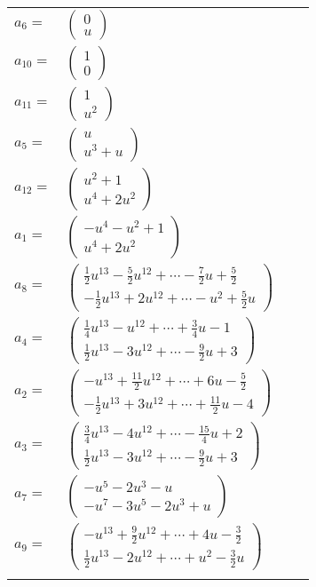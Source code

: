\documentclass[1p]{elsarticle_modified}
\theoremstyle{definition}
\begin{document}
\begin{tabular}{m{7pt} m{180pt} m{7pt} m{180pt} }
\flushright $a_{6}=$&$\begin{pmatrix}0\\u\end{pmatrix}$ \\
\flushright $a_{10}=$&$\begin{pmatrix}1\\0\end{pmatrix}$ \\
\flushright $a_{11}=$&$\begin{pmatrix}1\\u^2\end{pmatrix}$ \\
\flushright $a_{5}=$&$\begin{pmatrix}u\\u^3+u\end{pmatrix}$ \\
\flushright $a_{12}=$&$\begin{pmatrix}u^2+1\\u^4+2 u^2\end{pmatrix}$ \\
\flushright $a_{1}=$&$\begin{pmatrix}- u^4- u^2+1\\u^4+2 u^2\end{pmatrix}$ \\
\flushright $a_{8}=$&$\begin{pmatrix}\frac{1}{2} u^{13}-\frac{5}{2} u^{12}+\cdots-\frac{7}{2} u+\frac{5}{2}\\-\frac{1}{2} u^{13}+2 u^{12}+\cdots- u^2+\frac{5}{2} u\end{pmatrix}$ \\
\flushright $a_{4}=$&$\begin{pmatrix}\frac{1}{4} u^{13}- u^{12}+\cdots+\frac{3}{4} u-1\\\frac{1}{2} u^{13}-3 u^{12}+\cdots-\frac{9}{2} u+3\end{pmatrix}$ \\
\flushright $a_{2}=$&$\begin{pmatrix}- u^{13}+\frac{11}{2} u^{12}+\cdots+6 u-\frac{5}{2}\\-\frac{1}{2} u^{13}+3 u^{12}+\cdots+\frac{11}{2} u-4\end{pmatrix}$ \\
\flushright $a_{3}=$&$\begin{pmatrix}\frac{3}{4} u^{13}-4 u^{12}+\cdots-\frac{15}{4} u+2\\\frac{1}{2} u^{13}-3 u^{12}+\cdots-\frac{9}{2} u+3\end{pmatrix}$ \\
\flushright $a_{7}=$&$\begin{pmatrix}- u^5-2 u^3- u\\- u^7-3 u^5-2 u^3+u\end{pmatrix}$ \\
\flushright $a_{9}=$&$\begin{pmatrix}- u^{13}+\frac{9}{2} u^{12}+\cdots+4 u-\frac{3}{2}\\\frac{1}{2} u^{13}-2 u^{12}+\cdots+u^2-\frac{3}{2} u\end{pmatrix}$\\&\end{tabular}
\end{document}
